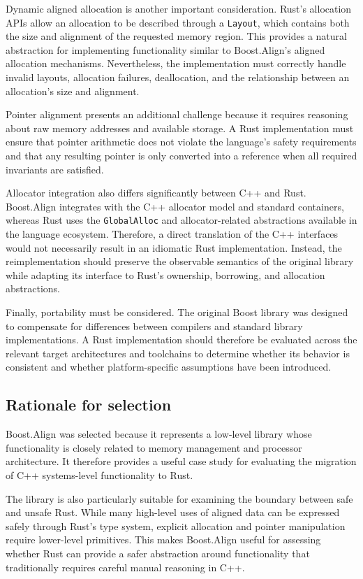 Dynamic aligned allocation is another important consideration. 
Rust's allocation APIs allow an allocation to be described through a \texttt{Layout}, 
which contains both the size and alignment of the requested memory region. 
This provides a natural abstraction for implementing functionality similar to Boost.Align's aligned allocation mechanisms. 
Nevertheless, the implementation must correctly handle invalid layouts, allocation failures, deallocation, 
and the relationship between an allocation's size and alignment.

Pointer alignment presents an additional challenge because it requires reasoning about raw memory addresses and available storage. 
A Rust implementation must ensure that pointer arithmetic does not violate the language's safety requirements and 
that any resulting pointer is only converted into a reference when all required invariants are satisfied.

Allocator integration also differs significantly between C++ and Rust. 
Boost.Align integrates with the C++ allocator model and standard containers, 
whereas Rust uses the \texttt{GlobalAlloc} and allocator-related abstractions available in the language ecosystem. 
Therefore, a direct translation of the C++ interfaces would not necessarily result in an idiomatic Rust implementation. 
Instead, the reimplementation should preserve the observable semantics of the original library while adapting its interface to Rust's ownership, 
borrowing, and allocation abstractions.

Finally, portability must be considered. 
The original Boost library was designed to compensate for differences between compilers and standard library implementations. 
A Rust implementation should therefore be evaluated across the relevant target architectures and 
toolchains to determine whether its behavior is consistent and whether platform-specific assumptions have been introduced.

\subsection{Rationale for selection}

Boost.Align was selected because it represents a low-level library whose functionality is closely related to memory management and 
processor architecture. It therefore provides a useful case study for evaluating the migration of C++ systems-level functionality to Rust.

The library is also particularly suitable for examining the boundary between safe and unsafe Rust. 
While many high-level uses of aligned data can be expressed safely through Rust's type system, 
explicit allocation and pointer manipulation require lower-level primitives. 
This makes Boost.Align useful for assessing whether Rust can provide a safer abstraction around functionality 
that traditionally requires careful manual reasoning in C++.

